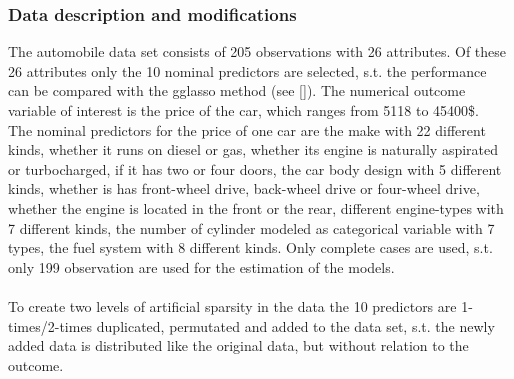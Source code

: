 \documentclass[12pt,letterpaper]{article}
\numberwithin{equation}{subsection}
\begin{document}
\subsubsection{Data description and modifications}
\label{sec:amdd}
The automobile data set consists of 205 observations with 26 attributes. Of these 26 attributes only the 10 nominal predictors are selected, s.t. the performance can be compared with the gglasso method (see [\cite{gglasso}]). The numerical outcome variable of interest is the price of the car, which ranges from 5118 to 45400\$. \\The nominal predictors for the price of one car are the make with 22 different kinds, whether it runs on diesel or gas, whether its engine is naturally aspirated or turbocharged, if  it has two or four doors, the car body design with 5 different kinds, whether is has front-wheel drive, back-wheel drive or four-wheel drive, whether the engine is located in the front or the rear, different engine-types with 7 different kinds, the number of cylinder modeled as categorical variable with 7 types, the fuel system with 8 different kinds. Only complete cases are used, s.t. only 199 observation are used for the estimation of the models.\\ \\
To create two levels of artificial sparsity in the data the 10 predictors are 1-times/2-times duplicated, permutated and added to the data set, s.t. the newly added data is distributed like the original data, but without relation to the outcome.
\end{document}
